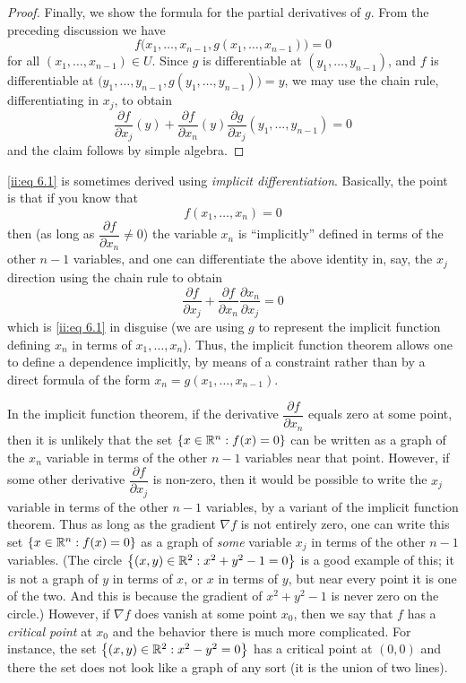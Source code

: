 \begin{proof}
  Finally, we show the formula for the partial derivatives of \(g\).
  From the preceding discussion we have
  \[
    f\big(x_1, \dots, x_{n - 1}, g(x_1, \dots, x_{n - 1})\big) = 0
  \]
  for all \((x_1, \dots, x_{n - 1}) \in U\).
  Since \(g\) is differentiable at \((y_1, \dots, y_{n - 1})\), and \(f\) is differentiable at \(\big(y_1, \dots, y_{n - 1}, g(y_1, \dots, y_{n - 1})\big) = y\), we may use the chain rule, differentiating in \(x_j\), to obtain
  \[
    \dfrac{\partial f}{\partial x_j}(y) + \dfrac{\partial f}{\partial x_n}(y) \dfrac{\partial g}{\partial x_j}(y_1, \dots, y_{n - 1}) = 0
  \]
  and the claim follows by simple algebra.
\end{proof}

\begin{rmk}\label{ii:6.8.2}
  \cref{ii:eq 6.1} is sometimes derived using \emph{implicit differentiation}.
  Basically, the point is that if you know that
  \[
    f(x_1, \dots, x_n) = 0
  \]
  then (as long as \(\dfrac{\partial f}{\partial x_n} \neq 0\)) the variable \(x_n\) is ``implicitly'' defined in terms of the other \(n - 1\) variables, and one can differentiate the above identity in, say, the \(x_j\) direction using the chain rule to obtain
  \[
    \dfrac{\partial f}{\partial x_j} + \dfrac{\partial f}{\partial x_n} \dfrac{\partial x_n}{\partial x_j} = 0
  \]
  which is \cref{ii:eq 6.1} in disguise
  (we are using \(g\) to represent the implicit function defining \(x_n\) in terms of \(x_1, \dots, x_n\)).
  Thus, the implicit function theorem allows one to define a dependence implicitly, by means of a constraint rather than by a direct formula of the form \(x_n = g(x_1, \dots, x_{n - 1})\).
\end{rmk}

\begin{note}
  In the implicit function theorem, if the derivative \(\dfrac{\partial f}{\partial x_n}\) equals zero at some point, then it is unlikely that the set \(\left\lbrace x \in \mathbb{R}^n : f(x) = 0\right\rbrace\) can be written as a graph of the \(x_n\) variable in terms of the other \(n - 1\) variables near that point.
  However, if some other derivative \(\dfrac{\partial f}{\partial x_j}\) is non-zero, then it would be possible to write the \(x_j\) variable in terms of the other \(n - 1\) variables, by a variant of the implicit function theorem.
  Thus as long as the gradient \(\nabla f\) is not entirely zero, one can write this set \(\left\lbrace x \in \mathbb{R}^n : f(x) = 0\right\rbrace\) as a graph of \emph{some} variable \(x_j\) in terms of the other \(n - 1\) variables.
  (The circle \(\left\lbrace(x, y) \in \mathbb{R}^2 : x^2 + y^2 - 1 = 0\right\rbrace\) is a good example of this;
  it is not a graph of \(y\) in terms of \(x\), or \(x\) in terms of \(y\), but near every point it is one of the two.
  And this is because the gradient of \(x^2 + y^2 - 1\) is never zero on the circle.)
  However, if \(\nabla f\) does vanish at some point \(x_0\), then we say that \(f\) has a \emph{critical point} at \(x_0\) and the behavior there is much more complicated.
  For instance, the set \(\left\lbrace(x, y) \in \mathbb{R}^2 : x^2 - y^2 = 0\right\rbrace\) has a critical point at \((0, 0)\) and there the set does not look like a graph of any sort
  (it is the union of two lines).
\end{note}

